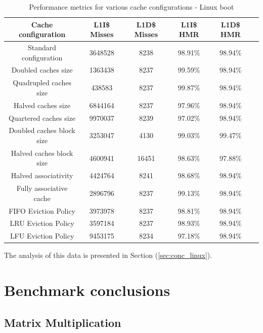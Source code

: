 \begin{center}
\begin{table}[!htbp]
\centering
\begin{tabular}{|c|c|c|c|c|c|}
\hline
\textbf{Cache configuration}  & \textbf{L1I\$ Misses} & \textbf{L1D\$ Misses} & \textbf{L1I\$ HMR} & \textbf{L1D\$ HMR}\\ \hline
Standard configuration & 3648528 & 8238 & 98.91\% & 98.94\% \\ \hline

\hline
Doubled caches size & 1363438 & 8237 & 99.59\% & 98.94\% \\ \hline
Quadrupled caches size & 438583 & 8237 & 99.87\% & 98.94\% \\ \hline
Halved caches size & 6844164 & 8237 & 97.96\% & 98.94\% \\ \hline
Quartered caches size & 9970037 & 8239 & 97.02\% & 98.94\% \\ \hline

\hline
Doubled caches block size & 3253047 & 4130 & 99.03\% & 99.47\% \\ \hline
Halved caches block size & 4600941 & 16451 & 98.63\% & 97.88\% \\ \hline

\hline
Halved associativity & 4424764 & 8241 & 98.68\% & 98.94\% \\ \hline
Fully associative cache & 2896796 & 8237 & 99.13\% & 98.94\% \\ \hline

\hline
FIFO Eviction Policy & 3973978 & 8237 & 98.81\% & 98.94\% \\ \hline
LRU Eviction Policy & 3597184 & 8237 & 98.93\% & 98.94\% \\ \hline
LFU Eviction Policy & 9453175 & 8234 & 97.18\% & 98.94\% \\ \hline

\end{tabular}
\caption{Performance metrics for various cache configurations - Linux boot}
\label{tab:performance_metrics_linux}
\end{table}
\end{center}
\noindent The analysis of this data is presented in Section (\ref{sec:conc_linux}).

\section{Benchmark conclusions}

\subsection*{Matrix Multiplication} \label{sec:conc_mm}

